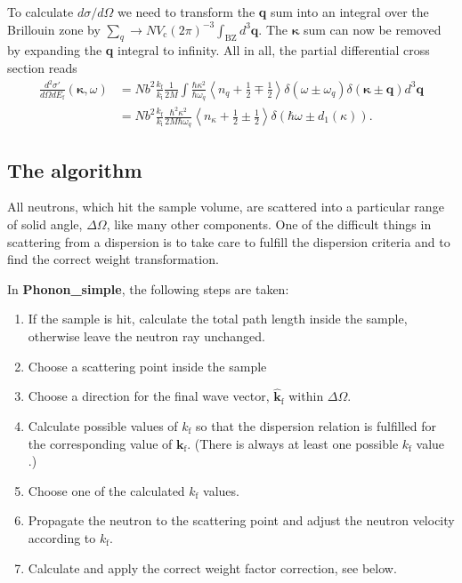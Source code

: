 To calculate $d\sigma/d\Omega$ we need to transform the
\textbf{q} sum into an integral over the Brillouin zone by
$\sum_q \rightarrow N V_\textrm{c} (2\pi)^{-3} \int_\textrm{BZ} d^3\textbf{q}$.
The $\boldsymbol{\kappa}$ sum can now be removed by
expanding the \textbf{q} integral to infinity.
All in all, the partial differential cross section reads
\begin{equation}
  \label{e:phonon-pdcross}
  \begin{aligned}
\frac{d^2\sigma'}{d\Omega dE_\textrm{f}}
  (\boldsymbol{\kappa},\omega) &= 
  N b^2 \frac{k_\textrm{f}}{k_\textrm{i}} \frac{1}{2M}
  \int \frac{\hbar \kappa^2}{\hbar \omega_q}
  \left\langle n_{q}+\frac{1}{2}\mp\frac{1}{2} \right\rangle
  \delta(\omega\pm\omega_{q}) \delta(\boldsymbol{\kappa}\pm\textbf{q})
   d^3\textbf{q}   \\
 &=  N b^2 \frac{k_\textrm{f}}{k_\textrm{i}}
          \frac{\hbar^2 \kappa^2}{2M \hbar \omega_q}
  \left\langle n_{\kappa}+\frac12\pm\frac12 \right\rangle
  \delta(\hbar\omega\pm d_1(\kappa)) . 
  \end{aligned}
\end{equation}

\subsection{The algorithm}
All neutrons, which hit the sample volume, are scattered
into a particular range of solid angle, $\Delta \Omega$,
like many other components. One of the difficult things in
scattering from a dispersion is to take care to fulfill the
dispersion criteria and to find the correct weight transformation.

In \textbf{Phonon\_simple}, the following steps are taken:
\begin{enumerate}
\item If the sample is hit, calculate the total path length inside the
sample, otherwise leave the neutron ray unchanged.
\item Choose a scattering point inside the sample
\item Choose a direction for the final wave vector, $\hat{\textbf{k}}_\textrm{f}$
within $\Delta\Omega$.
\item Calculate possible values of $k_\textrm{f}$ so that the
dispersion relation is fulfilled for the corresponding value
of $\textbf{k}_\textrm{f}$. (There is always at least one possible $k_\textrm{f}$
value \cite{bacon}.)
\item Choose one of the calculated $k_\textrm{f}$ values.
\item Propagate the neutron to the scattering point and adjust the
neutron velocity according to $k_\textrm{f}$.
\item Calculate and apply the correct weight factor correction, see below.
\end{enumerate}

